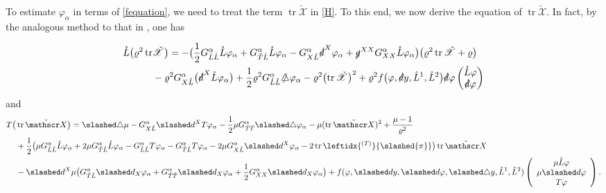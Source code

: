 \documentclass[11pt,twoside]{article}
\def\al{\alpha}
\def\vp{\varphi}
\def\f{\frac}
\begin{document}
To estimate $\vp_\alpha$ in terms of \eqref{fequation}, we need to treat the term $\operatorname{tr}\check{\mathscr X}$ in \eqref{H}.
To this end, we now derive the equation of $\operatorname{tr}\check{\mathscr X}$. In fact, by the analogous method to that in \cite[(2.44) and (2.45)]{Ding4}, one has
\begin{lemma}\label{YHCC-555}
 \begin{equation}\label{Lchi'}
 \begin{split}
 \mathring{L}\bigl(\varrho^2\operatorname{tr}&\check{\mathscr X}\bigr)
 = -\bigl(\frac{1}{2}G_{\mathring{L}\mathring{L}}^\al\mathring{L}\varphi_\al
 + G_{\tilde{T}\mathring{L}}^\al\mathring{L}\varphi_\al
 - G_{X\mathring{L}}^\al\slashed{d}^X\varphi_\al
 + \slashed{g}^{XX}G_{XX}^\al\mathring{L}\vp_\al\bigr)
 \big(\varrho^2\operatorname{tr}\check{\mathscr X} + \varrho\big) \\
 &-\varrho^2G_{X\mathring{L}}^\al\bigl(\slashed{d}^X\mathring{L}\varphi_\al\bigr)
 + \frac{1}{2}\varrho^2G_{\mathring{L}\mathring{L}}^\al\slashed{\triangle}\varphi_\al
 - \varrho^2\bigl(\operatorname{tr}\check{\mathscr X}\bigr)^2+ \varrho^2f\bigl(\varphi, \slashed{d}y, \mathring{L}^1, \mathring{L}^2\bigr)\slashed{d}\vp
 \begin{pmatrix} \mathring{L}\varphi \\ \slashed{d}\varphi \end{pmatrix}
 \end{split}
 \end{equation}
 and
 \begin{equation}\label{Tchi'}
 \begin{split}
 T\bigl(&\operatorname{tr}\check{\mathscr X}\bigr)=\slashed\triangle\mu-G_{X\mathring L}^\al\slashed d^XT\vp_\al-\f12\mu G_{\tilde T\tilde T}^\al\slashed\triangle\vp_\al-\mu(\operatorname{tr}\check{\mathscr X})^2+\f{\mu-1}{\varrho^2}\\
 &+\f12\bigr(\mu G_{\mathring L\mathring L}^\al\mathring L\vp_\al+2\mu G_{\tilde T\mathring L}^\al\mathring L\vp_\al-G_{\mathring L\mathring L}^\al T\vp_\al-G_{\tilde T\mathring L}^\al T\vp_\al-2\mu G_{X\mathring L}^\al\slashed d^X\vp_\al-2\operatorname{tr}\leftidx{^{(T)}}{\slashed{\pi}}\bigr)\operatorname{tr}\check{\mathscr X}\\
 &-\slashed d^X\mu\bigr(G_{\tilde T\mathring L}^\al\slashed d_X\vp_\al+G_{\tilde T\tilde T}^\al\slashed d_X\vp_\al+\f12G_{XX}^\al\slashed d_X\vp_\al\bigr)+f(\varphi, \slashed dy,\slashed d\vp,\slashed\triangle y, \mathring L^1,\mathring L^2)
 \left(
 \begin{array}{ccc}
 \mu\mathring L\varphi\\
 \mu\slashed d\varphi\\
 T{\varphi}\\
 \end{array}
 \right).
 \end{split}
 \end{equation}
\end{lemma}
\end{document}

